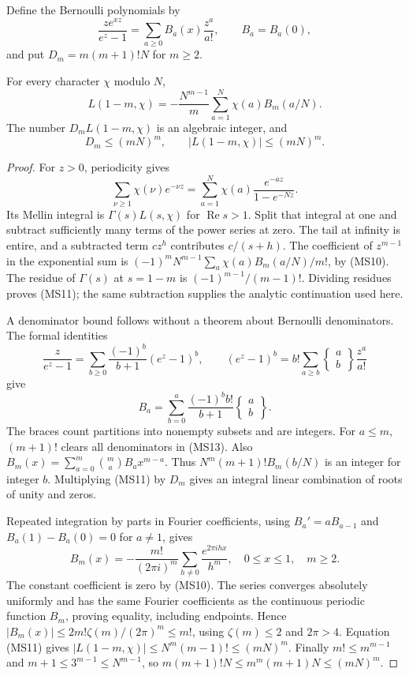Define the Bernoulli polynomials by
\[
 \frac{z e^{xz}}{e^z-1}
       =\sum_{a\ge0}B_a(x)\frac{z^a}{a!},
 \qquad B_a=B_a(0),
 \tag{MS10}
\]
and put $D_m=m(m+1)!N$ for $m\ge2$.

\begin{lemma}\label{ms-bernoulli}
For every character $\chi$ modulo $N$,
\[
 L(1-m,\chi)=
       -\frac{N^{m-1}}m\sum_{a=1}^N\chi(a)B_m(a/N).
 \tag{MS11}
\]
The number $D_mL(1-m,\chi)$ is an algebraic integer, and
\[
         D_m\le(mN)^m,\qquad |L(1-m,\chi)|\le(mN)^m.
 \tag{MS12}
\]
\end{lemma}
\begin{proof}
For $z>0$, periodicity gives
\[
 \sum_{\nu\ge1}\chi(\nu)e^{-\nu z}
       =\sum_{a=1}^N\chi(a)\frac{e^{-az}}{1-e^{-Nz}}.
\]
Its Mellin integral is $\Gamma(s)L(s,\chi)$ for
$\operatorname{Re}s>1$.
Split that integral at one and subtract sufficiently many
terms of the power series at zero.
The tail at infinity is entire, and a subtracted term
$c z^h$ contributes $c/(s+h)$.
The coefficient of $z^{m-1}$ in the exponential sum is
$(-1)^mN^{m-1}\sum_a\chi(a)B_m(a/N)/m!$, by (MS10).
The residue of $\Gamma(s)$ at $s=1-m$ is
$(-1)^{m-1}/(m-1)!$.
Dividing residues proves (MS11); the same subtraction
supplies the analytic continuation used here.

A denominator bound follows without a theorem about
Bernoulli denominators.  The formal identities
\[
 \frac z{e^z-1}=\sum_{b\ge0}\frac{(-1)^b}{b+1}(e^z-1)^b,
 \qquad
 (e^z-1)^b=b!\sum_{a\ge b}
    \left\{\begin{smallmatrix}a\\b\end{smallmatrix}\right\}
    \frac{z^a}{a!}
\]
give
\[
 B_a=\sum_{b=0}^a\frac{(-1)^b b!}{b+1}
                \left\{\begin{smallmatrix}a\\b\end{smallmatrix}\right\}.
 \tag{MS13}
\]
The braces count partitions into nonempty subsets and
are integers.  For $a\le m$, $(m+1)!$ clears all
denominators in (MS13).
Also $B_m(x)=\sum_{a=0}^m\binom ma B_a x^{m-a}$.
Thus $N^m(m+1)!B_m(b/N)$ is an integer for integer $b$.
Multiplying (MS11) by $D_m$ gives an integral linear
combination of roots of unity and zeros.

Repeated integration by parts in Fourier coefficients,
using $B_a'=aB_{a-1}$ and
$B_a(1)-B_a(0)=0$ for $a\ne1$, gives
\[
 B_m(x)=-\frac{m!}{(2\pi i)^m}
          \sum_{h\ne0}\frac{e^{2\pi ihx}}{h^m},
                  \quad 0\le x\le1,\quad m\ge2.
 \tag{MS14}
\]
The constant coefficient is zero by (MS10).
The series converges absolutely uniformly and has the
same Fourier coefficients as the continuous periodic
function $B_m$, proving equality, including endpoints.
Hence
$|B_m(x)|\le2m!\zeta(m)/(2\pi)^m\le m!$,
using $\zeta(m)\le2$ and $2\pi>4$.
Equation (MS11) gives
$|L(1-m,\chi)|\le N^m(m-1)!\le(mN)^m$.
Finally $m!\le m^{m-1}$ and
$m+1\le3^{m-1}\le N^{m-1}$, so
$m(m+1)!N\le m^m(m+1)N\le(mN)^m$.
\end{proof}

